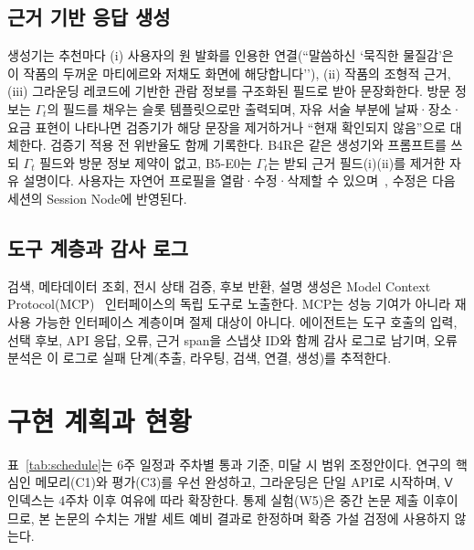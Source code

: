\documentclass[10pt,twocolumn,letterpaper]{article}
\newcommand{\sV}{\mathsf{V}}
\begin{document}
\subsection{근거 기반 응답 생성}
생성기는 추천마다 (i) 사용자의 원 발화를 인용한 연결(``말씀하신 `묵직한 물질감'은 이 작품의 두꺼운 마티에르와 저채도 화면에 해당합니다''), (ii) 작품의 조형적 근거, (iii) 그라운딩 레코드에 기반한 관람 정보를 구조화된 필드로 받아 문장화한다. 방문 정보는 $\Gamma_t$의 필드를 채우는 슬롯 템플릿으로만 출력되며, 자유 서술 부분에 날짜·장소·요금 표현이 나타나면 검증기가 해당 문장을 제거하거나 ``현재 확인되지 않음''으로 대체한다. 검증기 적용 전 위반율도 함께 기록한다. B4R은 같은 생성기와 프롬프트를 쓰되 $\Gamma_t$ 필드와 방문 정보 제약이 없고, B5-E0는 $\Gamma_t$는 받되 근거 필드(i)(ii)를 제거한 자유 설명이다. 사용자는 자연어 프로필을 열람·수정·삭제할 수 있으며~\cite{friedman2023recllm}, 수정은 다음 세션의 Session Node에 반영된다.

\subsection{도구 계층과 감사 로그}
검색, 메타데이터 조회, 전시 상태 검증, 후보 반환, 설명 생성은 Model Context Protocol(MCP)~\cite{mcp2024} 인터페이스의 독립 도구로 노출한다. MCP는 성능 기여가 아니라 재사용 가능한 인터페이스 계층이며 절제 대상이 아니다. 에이전트는 도구 호출의 입력, 선택 후보, API 응답, 오류, 근거 span을 스냅샷 ID와 함께 감사 로그로 남기며, 오류 분석은 이 로그로 실패 단계(추출, 라우팅, 검색, 연결, 생성)를 추적한다.

\section{구현 계획과 현황}
표~\ref{tab:schedule}는 6주 일정과 주차별 통과 기준, 미달 시 범위 조정안이다. 연구의 핵심인 메모리(C1)와 평가(C3)를 우선 완성하고, 그라운딩은 단일 API로 시작하며, $\sV$ 인덱스는 4주차 이후 여유에 따라 확장한다. 통제 실험(W5)은 중간 논문 제출 이후이므로, 본 논문의 수치는 개발 세트 예비 결과로 한정하며 확증 가설 검정에 사용하지 않는다.
\end{document}
